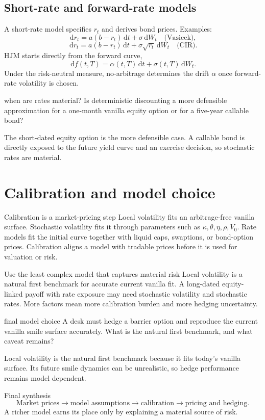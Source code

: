 \documentclass[10pt]{article}
\newcommand{\dd}{\,\mathrm d}\newcommand{\Var}{\operatorname{Var}}
\theoremstyle{definition}\newtheorem{definition}{Definition}[section]
\begin{document}
\subsection{Short-rate and forward-rate models}
A short-rate model specifies \(r_t\) and derives bond prices. Examples:
\[
\dd r_t=a(b-r_t)\dd t+\sigma\dd W_t\quad\text{(Vasicek)},
\]
\[
\dd r_t=a(b-r_t)\dd t+\sigma\sqrt{r_t}\dd W_t\quad\text{(CIR)}.
\]
HJM starts directly from the forward curve,
\[
\dd f(t,T)=\alpha(t,T)\dd t+\sigma(t,T)\dd W_t.
\]
Under the risk-neutral measure, no-arbitrage determines the drift
\(\alpha\) once forward-rate volatility is chosen.

\begin{studentexercise}{when are rates material?}
Is deterministic discounting a more defensible approximation for a
one-month vanilla equity option or for a five-year callable bond?
\end{studentexercise}
\begin{shortsolution}
The short-dated equity option is the more defensible case. A callable bond
is directly exposed to the future yield curve and an exercise decision, so
stochastic rates are material.
\end{shortsolution}

\section{Calibration and model choice}
\begin{keyidea}{Calibration is a market-pricing step}
Local volatility fits an arbitrage-free vanilla surface. Stochastic
volatility fits it through parameters such as
\(\kappa,\theta,\eta,\rho,V_0\). Rate models fit the initial curve together
with liquid caps, swaptions, or bond-option prices. Calibration aligns a
model with tradable prices before it is used for valuation or risk.
\end{keyidea}
\begin{warningbox}{Use the least complex model that captures material risk}
Local volatility is a natural first benchmark for accurate current vanilla
fit. A long-dated equity-linked payoff with rate exposure may need
stochastic volatility and stochastic rates. More factors mean more
calibration burden and more hedging uncertainty.
\end{warningbox}
\begin{studentexercise}{final model choice}
A desk must hedge a barrier option and reproduce the current vanilla smile
surface accurately. What is the natural first benchmark, and what caveat
remains?
\end{studentexercise}
\begin{shortsolution}
Local volatility is the natural first benchmark because it fits today's
vanilla surface. Its future smile dynamics can be unrealistic, so hedge
performance remains model dependent.
\end{shortsolution}
\begin{keyidea}{Final synthesis}
\[
\boxed{\text{Market prices}\longrightarrow\text{model assumptions}
\longrightarrow\text{calibration}\longrightarrow\text{pricing and hedging}.}
\]
A richer model earns its place only by explaining a material source of risk.
\end{keyidea}
\end{document}
